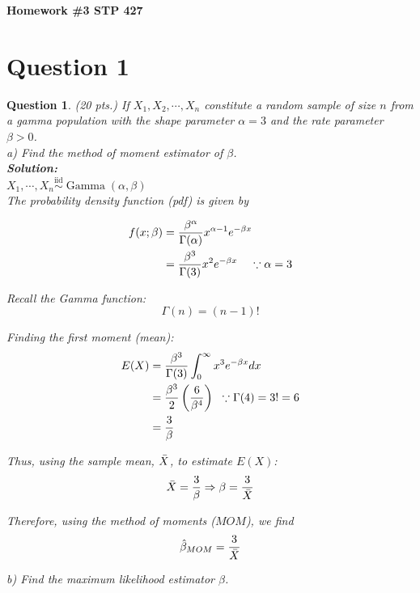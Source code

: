 \documentclass{article}
\theoremstyle{questionstyle}
\newtheorem{myquestion}{Question}
\begin{document}
\begin{center}
    \Large{\textbf{Homework \#3 STP 427}}
\end{center}

\section{Question 1}
\begin{myquestion}
    (20 pts.) If \(X_1, X_2, \cdots , X_n\) constitute a random sample of size \(n\) from a gamma population with the shape parameter \(\alpha = 3\) and the rate parameter \(\beta > 0\).\\

a) Find the method of moment estimator of \(\beta\).\\

\textbf{Solution:}\\
\(X_1, \cdots, X_n \overset{\text{iid}}{\sim} \operatorname{Gamma}(\alpha, \beta)\)\\

The probability density function (pdf) is given by

\begin{align*}
    f(x; \beta) &= \frac{\beta^{\alpha}}{\Gamma(\alpha)} x^{\alpha-1}e^{-\beta x} \\
    &= \frac{\beta^{3}}{\Gamma(3)} x^{2}e^{-\beta x} \hspace{0.4cm} \because \alpha = 3\\
\end{align*}

Recall the Gamma function: 
\[ \Gamma(n) = (n-1)! \]

Finding the first moment (mean):
\begin{align*}
    E(X) &= \frac{\beta^{3}}{\Gamma(3)}\int_{0}^{\infty}x^{3}e^{-\beta x}dx\\
    &= \frac{\beta^{3}}{2} \left(\frac{6}{\beta^4}\right) \hspace{.2cm} \because \Gamma(4) = 3! = 6\\
    &= \frac{3}{\beta}
\end{align*}

Thus, using the sample mean, \(\Bar{X}\), to estimate \(E(X)\):
\[\Bar{X} = \frac{3}{\beta} \Rightarrow \beta = \frac{3}{\Bar{X}}\]

Therefore, using the method of moments (\(MOM\)), we find 
\[ \hat{\beta}_{MOM} = \frac{3}{\Bar{X}} \]


b) Find the maximum likelihood estimator \(\beta\).\\


\end{myquestion}
\end{document}
